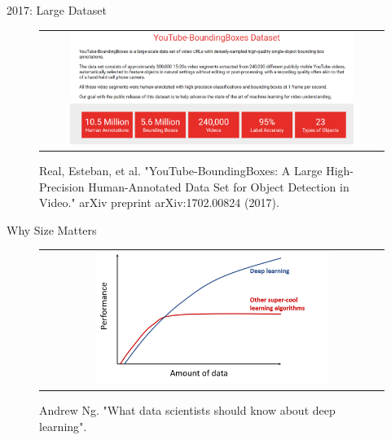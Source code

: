 \documentclass[aspectratio=169]{beamer}
\begin{document}

\begin{frame}{2017: Large Dataset}
\begin{figure}
\begin{tabular}{c}
\includegraphics[width=0.85\textwidth]{img/dnn/2017_large_dataset.png}\\
\end{tabular}
\vspace{0.5cm}
\caption{Real, Esteban, et al. "YouTube-BoundingBoxes: A Large High-Precision Human-Annotated Data Set for Object Detection in Video." arXiv preprint arXiv:1702.00824 (2017).}
\end{figure}
\end{frame}


\begin{frame}{Why Size Matters}
\begin{figure}
\begin{tabular}{c}
\includegraphics[width=0.7\textwidth]{img/dnn/deep_learning_scale.png}
\end{tabular}
\caption{Andrew Ng. "What data scientists should know about deep learning".}
\end{figure}
\end{frame}

\end{document}
